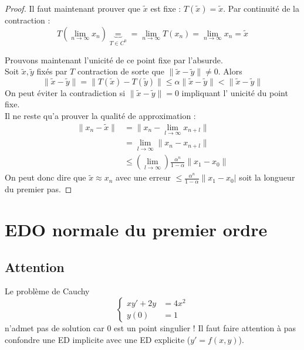 \begin{proof}
	Il faut maintenant prouver que $\tilde{x}$ est fixe : $T(\tilde{x}) = \tilde{x}$. 
	Par continuité de la contraction :
	\begin{equation}
		T(\lim\limits_{n\rightarrow\infty} x_n) \underbrace{=}_{T \in C^0} = \lim\limits_{n
			\rightarrow\infty} T(x_n) = \lim\limits_{n\rightarrow\infty} x_n = \tilde{x}
	\end{equation}
		
		
	Prouvons maintenant l'unicité de ce point fixe par l'absurde.\\
	Soit $\tilde{x}, \tilde{y}$ fixés par $T$ contraction de sorte que $\|\tilde{x}
	-\tilde{y}\| \neq 0$. Alors 
	\begin{equation}
		\|\tilde{x}-\tilde{y}\| = \| T(\tilde{x}) - T(\tilde{y})\| \leq\alpha\|\tilde{x}-
		\tilde{y}\| < \|\tilde{x}-\tilde{y}\|
	\end{equation}
	On peut éviter la contradiction si $\|\tilde{x}-\tilde{y}\| = 0$ impliquant l'
	unicité du point fixe.\\
			
	Il ne reste qu'a prouver la qualité de approximation :
	\begin{equation}
		\begin{array}{ll}
			\| x_n-\tilde{x}\| & = \|x_n - \lim\limits_{l\rightarrow\infty} x_{n+l}\|                         \\
			                   & = \lim\limits_{l\rightarrow\infty} \|x_n-x_{n+l}\|                           \\
			                   & \leq \left(\lim\limits_{l\rightarrow\infty}\right) \frac{\alpha^n}{1-\alpha} 
			\|x_1-x_0\|
		\end{array}
	\end{equation}
	On peut donc dire que $\tilde{x} \approx x_n$ avec une erreur $\leq \frac{\alpha^n}{
		1-\alpha}\|x_1-x_0|$ soit la longueur du premier pas.
\end{proof}
	



\setcounter{section}{0}
\section{EDO normale du premier ordre}
\subsection{Attention }
Le problème de Cauchy 
\begin{equation}
	\left\{\begin{array}{ll}
	xy' + 2y &= 4x^2	\\
	y(0) &= 1
	\end{array}\right.
\end{equation}
n'admet pas de solution car 0 est un point singulier ! Il faut faire attention à 
pas confondre une ED implicite avec une ED explicite ($y' = f(x,y)$).
	
